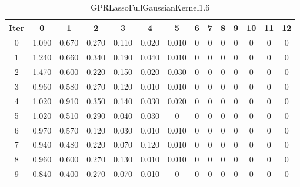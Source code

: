 \begin{table}
	\begin{center}
		\begin{tabular}{|c|c|c|c|c|c|c|c|c|c|c|c|c|c|}
			\hline
			Iter & 0 & 1 & 2 & 3 & 4 & 5 & 6 & 7 & 8 & 9 & 10 & 11 & 12 \\
			\hline
			0 & 1.090 & 0.670 & 0.270 & 0.110 & 0.020 & 0.010 & 0 & 0 & 0 & 0 & 0 & 0 & 0 \\
			\hline
			1 & 1.240 & 0.660 & 0.340 & 0.190 & 0.040 & 0.010 & 0 & 0 & 0 & 0 & 0 & 0 & 0 \\
			\hline
			2 & 1.470 & 0.600 & 0.220 & 0.150 & 0.020 & 0.030 & 0 & 0 & 0 & 0 & 0 & 0 & 0 \\
			\hline
			3 & 0.960 & 0.580 & 0.270 & 0.120 & 0.010 & 0.010 & 0 & 0 & 0 & 0 & 0 & 0 & 0 \\
			\hline
			4 & 1.020 & 0.910 & 0.350 & 0.140 & 0.030 & 0.020 & 0 & 0 & 0 & 0 & 0 & 0 & 0 \\
			\hline
			5 & 1.020 & 0.510 & 0.290 & 0.040 & 0.030 & 0 & 0 & 0 & 0 & 0 & 0 & 0 & 0 \\
			\hline
			6 & 0.970 & 0.570 & 0.120 & 0.030 & 0.010 & 0.010 & 0 & 0 & 0 & 0 & 0 & 0 & 0 \\
			\hline
			7 & 0.940 & 0.480 & 0.220 & 0.070 & 0.120 & 0.010 & 0 & 0 & 0 & 0 & 0 & 0 & 0 \\
			\hline
			8 & 0.960 & 0.600 & 0.270 & 0.130 & 0.010 & 0.010 & 0 & 0 & 0 & 0 & 0 & 0 & 0 \\
			\hline
			9 & 0.840 & 0.400 & 0.270 & 0.070 & 0.010 & 0 & 0 & 0 & 0 & 0 & 0 & 0 & 0 \\
			\hline
		\end{tabular}
	\end{center}
	\caption{GPRLassoFullGaussianKernel1.6}
\end{table}
